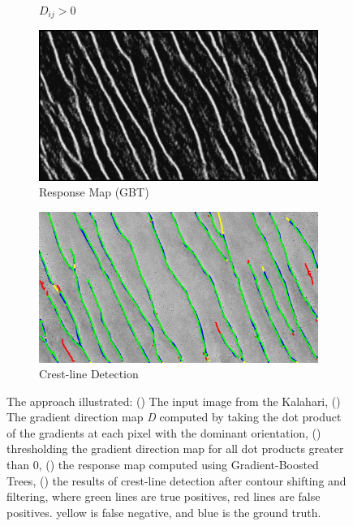 \begin{figure}[htbp]
\begin{subfigure}[b]{0.3\textwidth}
		\caption{$D_{ij} > 0$}
		\label{fig:orientation_based_threshold_dot_product}
	\end{subfigure}
	\begin{subfigure}[b]{0.45\textwidth}
		\centering
		\includegraphics[width=\linewidth]{figures/kalahari_response}
		\caption{Response Map (GBT)}
		\label{fig:kalahari_response}
	\end{subfigure}
	\begin{subfigure}[b]{0.45\textwidth}
		\centering
		\includegraphics[width=\linewidth]{figures/kalahari_results}
		\caption{Crest-line Detection}
		\label{fig:kalahari_results}
	\end{subfigure}
	\caption{The approach illustrated: () The input image from the Kalahari, () The gradient direction map \emph{D} computed by taking the dot product of the gradients at each pixel with the dominant orientation, () thresholding the gradient direction map for all dot products greater than 0, () the response map computed using Gradient-Boosted Trees, () the results of crest-line detection after contour shifting and filtering, where green lines are true positives, red lines are false positives. yellow is false negative, and blue is the ground truth. }
	\label{fig:orientation_based_process}
\end{figure}


